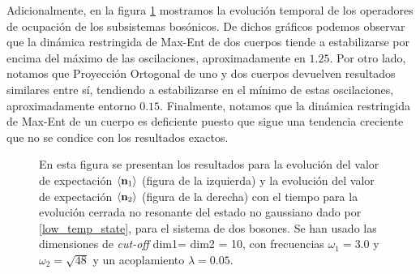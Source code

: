 \documentclass{report} %
\newcommand{\lgg}{\langle}
\newcommand{\rgg}{\rangle}
\numberwithin{equation}{section}
\begin{document}
Adicionalmente, en la figura \ref{ocupations_low_closed_nonres}
mostramos la evolución temporal de los operadores de ocupación de los subsistemas bosónicos. De dichos gráficos podemos observar que la dinámica restringida de Max-Ent de dos cuerpos tiende a estabilizarse por encima del máximo de las oscilaciones, aproximadamente en $1.25$. Por otro lado, notamos que Proyección Ortogonal de uno y dos cuerpos devuelven resultados similares entre sí, tendiendo a estabilizarse en el mínimo de estas oscilaciones, aproximadamente entorno $0.15$. Finalmente, notamos que la dinámica restringida de Max-Ent de un cuerpo es deficiente puesto que sigue una tendencia creciente que no se condice con los resultados exactos.

\begin{figure}
    \centering
    \qquad
    \caption{En esta figura se presentan los resultados para la evolución del valor de expectación $\lgg {\bf n}_1 \rgg$ (figura de la izquierda) y la evolución del valor de expectación $\lgg {\bf n}_2 \rgg$ (figura de la derecha) con el tiempo para la evolución cerrada no resonante del estado no gaussiano dado por \eqref{low_temp_state}, para el sistema de dos bosones. Se han usado las dimensiones de \textit{cut-off} dim1= dim2 = 10, con frecuencias $\omega_1 = 3.0$ y $\omega_2 =\sqrt{48}$ y un acoplamiento $\lambda = 0.05$.}
    \label{ocupations_low_closed_nonres}
\end{figure}
\end{document}
